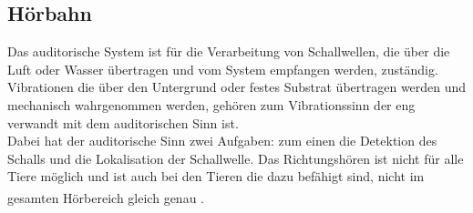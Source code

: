 \documentclass[12pt,a4paper,pdftex]{article}
\begin{document}
\subsection{Hörbahn}

Das auditorische System  ist für die Verarbeitung von Schallwellen, die über die Luft oder Wasser übertragen und vom System empfangen werden, zuständig. Vibrationen die über den Untergrund oder festes Substrat übertragen werden und mechanisch wahrgenommen werden, gehören zum Vibrationssinn der eng verwandt mit dem auditorischen Sinn ist.
\\
\noindent Dabei hat der auditorische Sinn zwei Aufgaben: zum einen die Detektion des Schalls und die Lokalisation der Schallwelle. Das Richtungshören ist nicht für alle Tiere möglich und ist auch bei den Tieren die dazu befähigt sind, nicht im gesamten Hörbereich gleich genau \textsuperscript{\cite[18]{penzlin2005tierphys}}.
\end{document}

